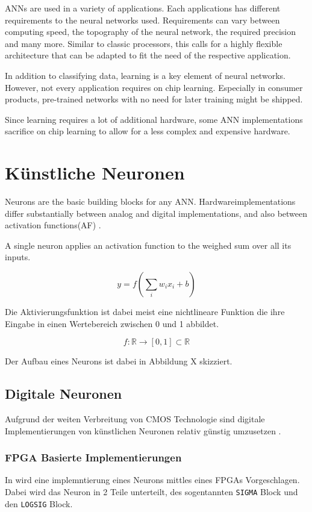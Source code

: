\documentclass[conference]{IEEEtran}
\begin{document}
    ANNs are used in a variety of applications.
    Each applications has different requirements to the neural networks used.
    Requirements can vary between computing speed, the topography of the neural network, the required precision and many more.
    Similar to classic processors, this calls for a highly flexible architecture that can be adapted to fit the need of the respective application.

    In addition to classifying data, learning is a key element of neural networks.
    However, not every application requires on chip learning.
    Especially in consumer products, pre-trained networks with no need for later training might be shipped.

    Since learning requires a lot of additional hardware, some ANN implementations sacrifice on chip learning to allow for a less complex and expensive hardware.


    \section{Künstliche Neuronen}

    Neurons are the basic building blocks for any ANN.
    Hardwareimplementations differ substantially between analog and digital implementations, and also between activation functions(AF) \cite{habib1989digital}.

    A single neuron applies an activation function to the weighed sum over all its inputs.

    \[y = f(\sum_i {w_ix_i} + b)\]

    Die Aktivierungsfunktion ist dabei meist eine nichtlineare Funktion die ihre Eingabe in einen Wertebereich zwischen 0 und 1 abbildet.

    \[ f: \mathbb{R} \to [0,1] \subset \mathbb{R} \]

    Der Aufbau eines Neurons ist dabei in Abbildung X skizziert.

    \subsection{Digitale Neuronen}

    Aufgrund der weiten Verbreitung von CMOS Technologie sind digitale Implementierungen von künstlichen Neuronen relativ günstig umzusetzen\cite{misra2010artificial} .

    \subsubsection{FPGA Basierte Implementierungen}
    In \cite{muthuramalingam2008neural} wird eine implemntierung eines Neurons mittles eines FPGAs Vorgeschlagen.
    Dabei wird das Neuron in 2 Teile unterteilt, des sogentannten \texttt{SIGMA} Block und den \texttt{LOGSIG} Block.
\end{document}
